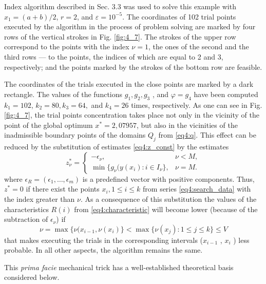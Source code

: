 \documentclass[graybox]{svmult}
\begin{document}
Index algorithm described in Sec. 3.3 was used to solve this example with $x_1=(a+b)/2$, $r=2$, and $\varepsilon=10^{-5}$. The coordinates of 102 trial points executed by the algorithm in the process of problem solving are marked by four rows of the vertical strokes in Fig. \ref{fig:4_7}. The strokes of the upper row correspond to the points with the index $\nu=1$, the ones of the second and the third rows --- to the points, the indices of which are equal to 2 and 3, respectively; and the points
marked by the strokes of the bottom row are feasible.

The coordinates of the trials executed in the close points are marked by a dark rectangle. The values of the functions $g_1 , g_2 , g_3$ , and $\varphi=g_4$ have been computed $k_1=102$, $k_2=80, k_3=64,$ and $k_4=26$ times, respectively. As one can see in Fig. \ref{fig:4_7}, the trial points concentration takes place not only in the vicinity of the point of the global optimum $x^*=2,07957$, but also in the vicinities of the inadmissible boundary points of the domains $Q_j$ from \eqref{eq4:q}. This effect can be reduced by the substitution of estimates \eqref{eq4:z_const} by the estimates
\begin{equation}
  z_\nu^\ast = \left\{
  \begin{array}{lr}
    -\epsilon_\nu, & \nu < M,\\
    \min\{ g_\nu(y(x_i): i\in I_\nu \}, & \nu = M.
  \end{array}
  \right.
\end{equation}
where $\epsilon_R=(\epsilon_1 ,\dots, \epsilon_m)$ is a predefined vector with positive components. Thus, $z^*=0$ if there exist the points $x_i,1\le i\le k$ from series \eqref{eq4:search_data} with the index greater than $\nu$. As a consequence of this substitution the values of the characteristics $R(i)$ from \eqref{eq4:characteristic} will become lower (because of the subtraction of $\epsilon_\nu$) if
\begin{equation}
  \nu=\max\{\nu(x_{i-1},\nu(x_i)\}<\max\{\nu(x_j):1\le j\le k\}\le V
\end{equation}
that makes executing the trials in the corresponding intervals  ($x_{i-1}$ , $x_i$ ) less probable. In all other aspects, the algorithm remains the same.

This \emph{prima facie} mechanical trick has a well-established theoretical basis considered below.
\end{document}
